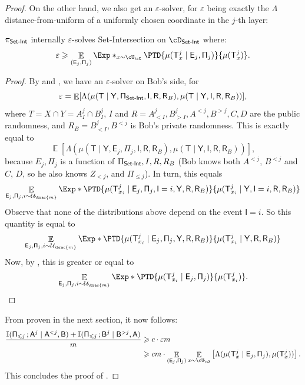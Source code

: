 \documentclass[11pt,letterpaper]{article}
\newcommand{\eps}{\varepsilon}
\DeclareMathOperator*{\E}{\mathbb{E}}
\renewcommand{\geq}{\geqslant}
\renewcommand{\leq}{\leqslant}
\renewcommand{\le}{\leq}
\renewcommand{\ge}{\geq}
\theoremstyle{definition}
\newcommand{\dsi}{\cD_\SI}
\newcommand{\rPi}{\rv{\Pi}}
\newcommand{\uni}{\mathcal{U}}
\newcommand{\rA}{\rv{A}}
\newcommand{\rB}{\rv{B}}
\newcommand{\rY}{\rv{Y}}
\newcommand{\rI}{\rv{I}}
\newcommand{\rv}[1]{\ensuremath{\mathsf{#1}}}
\newcommand{\II}{\ensuremath{\mathbb{I}}}
\newcommand{\mi}[2]{\ensuremath{\II(#1 \,; #2)}}
\newcommand{\rT}{\rv{T}}
\newcommand{\rE}{\rv{E}}
\newcommand{\SI}{\ensuremath{\textnormal{\textsf{Set-Int}}}\xspace}
\newcommand{\rR}{\rv{R}}
\begin{document}
\begin{proof}
On the other hand, we also get an $\eps$-solver, for $\eps$ being exactly the $\Lambda$ distance-from-uniform of a uniformly chosen coordinate in the $j$-th layer:

\begin{claim} \label{clm:average-coordinate}
$\pi_\SI$ internally $\eps$-solves Set-Intersection on $\dsi$ where:
\[
  \eps \geq \E_{(\rE_j, \rPi_j)}
  \Exp*_{x \sim \cU_\cX} {\PTD{\mu(\rT^j_x \mid \rE_j, \rPi_j)}{\mu(\rT^j_x)}}.
\]
\end{claim}


\begin{proof} 
     By  and , we have an $\eps$-solver on Bob's side, for
     \[
       \eps = \E[\Lambda(\mu(\rT \mid \rY, \rPi_\SI,
     \rI, \rR, \rR_B), \mu(\rT \mid \rY, \rI, \rR, \rR_B))], 
     \]
     where $T = X \cap Y = A^j_I \cap B^j_I$,
     $I$ and $R = A^j_{<I}, B^j_{>I}, A^{< j}, B^{> j}, C, D$ are the public
     randomness, and
     $R_B = B^j_{< I}, B^{< j}$ is Bob's private randomness. 
     This is exactly equal to
     \[
     \E[\Lambda(\mu(\rT \mid \rY, \rE_j, \rPi_{j}, \rI, \rR, \rR_B),
     \mu(\rT \mid \rY, \rI, \rR, \rR_B))], \]
     because $E_j, \Pi_j$ is a function of $\Pi_\SI, I, R, R_B$ (Bob knows both
     $A^{<j}$, $B^{<j}$ and $C$, $D$, so he also knows $Z_{< j}$, and
     $\Pi_{\le j}$).
     In turn, this equals
     \begin{align*}
       \E_{\rE_j,\rPi_j, i \sim \uni_{\brac{m}}}
       \Exp*{\PTD{\mu(\rT^j_{x_i} \mid \rE_j, \rPi_{j}, \rI = i, \rY, \rR,\rR_B)}
       {\mu(\rT^j_{x_i}\mid \rY, \rI=i,\rR, \rR_B)}}
     \end{align*}
     Observe that none of the distributions above depend on the event $\rI = i$. So this quantity is equal to
     \begin{align*}
       \E_{\rE_j,\rPi_j, i \sim \uni_{\brac{m}}}
       \Exp*{\PTD{\mu(\rT^j_{x_i} \mid \rE_j, \rPi_{j}, \rY, \rR,\rR_B)}
       {\mu(\rT^j_{x_i}\mid \rY, \rR, \rR_B)}}
     \end{align*}
     Now, by , this is greater or equal to
     \[
       \E_{\rE_j,\rPi_j, i \sim \uni_{\brac{m}}}
       \Exp*{\PTD{\mu(\rT^j_{x_i} \mid \rE_j, \rPi_{j} )}{\mu(\rT^j_{x_i})}}. \qedhere
     \]
\end{proof}


From  proven in the next section, it now follows:
  \begin{align*}
    \frac{\mi{\rPi_{\le j}}{\rA^j \mid \rA^{< j}, \rB} + \mi{\rPi_{\leq j}}{\rB^j \mid \rB^{> j}, \rA}}{m} & \ge c \cdot \eps m\\
    & \geq c m \cdot \E_{(\rE_j, \rPi_j)}\E_{x \sim \cU_\cX}
    \left[\Lambda(\mu(\rT^j_x \mid \rE_j, \rPi_j), \mu(\rT^j_x)) \right].
  \end{align*}
  This concludes the proof of .
\end{proof}
\end{document}
